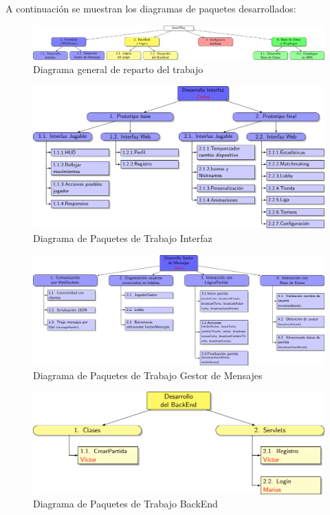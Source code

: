 A continuación se muestran los diagramas de paquetes desarrollados:

\begin{figure}[H]
		\hspace{-2cm}
		\includegraphics[scale=0.6]{figuras/edtGeneral.pdf}
		\caption{Diagrama general de reparto del trabajo}
	\end{figure}

\begin{figure}[H]
		\centering
		\includegraphics[scale=0.85]{figuras/edtInterfaz.pdf}
		\caption{Diagrama de Paquetes de Trabajo Interfaz}
	\end{figure}

\begin{figure}[H]
		\hspace{-2cm}
		\includegraphics[scale=0.75]{figuras/edtGestorMensajes.pdf}
		\caption{Diagrama de Paquetes de Trabajo Gestor de Mensajes}
	\end{figure}


\begin{figure}[H]
		\centering
		\includegraphics[scale=0.8]{figuras/edtBackend.pdf}
		\caption{Diagrama de Paquetes de Trabajo BackEnd}
	\end{figure}

